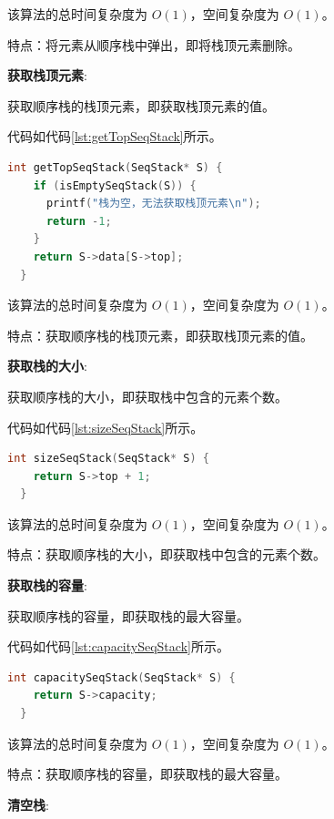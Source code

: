 \documentclass[lang=cn,newtx,10pt,scheme=chinese]{elegantbook}
\begin{document}
该算法的总时间复杂度为 $O(1)$，空间复杂度为 $O(1)$。

特点：将元素从顺序栈中弹出，即将栈顶元素删除。

\textbf{获取栈顶元素}:

获取顺序栈的栈顶元素，即获取栈顶元素的值。

代码如代码\ref{lst:getTopSeqStack}所示。

\begin{lstlisting}[language=C++, caption={获取顺序栈的栈顶元素示例代码}, label={lst:getTopSeqStack}]
  int getTopSeqStack(SeqStack* S) {
    if (isEmptySeqStack(S)) {
      printf("栈为空，无法获取栈顶元素\n");
      return -1;
    }
    return S->data[S->top];
  }

\end{lstlisting}

该算法的总时间复杂度为 $O(1)$，空间复杂度为 $O(1)$。

特点：获取顺序栈的栈顶元素，即获取栈顶元素的值。

\textbf{获取栈的大小}:

获取顺序栈的大小，即获取栈中包含的元素个数。

代码如代码\ref{lst:sizeSeqStack}所示。

\begin{lstlisting}[language=C++, caption={获取顺序栈的大小示例代码}, label={lst:sizeSeqStack}]
  int sizeSeqStack(SeqStack* S) {
    return S->top + 1;
  }

\end{lstlisting}

该算法的总时间复杂度为 $O(1)$，空间复杂度为 $O(1)$。

特点：获取顺序栈的大小，即获取栈中包含的元素个数。

\textbf{获取栈的容量}:

获取顺序栈的容量，即获取栈的最大容量。

代码如代码\ref{lst:capacitySeqStack}所示。

\begin{lstlisting}[language=C++, caption={获取顺序栈的容量示例代码}, label={lst:capacitySeqStack}]
  int capacitySeqStack(SeqStack* S) {
    return S->capacity;
  }

\end{lstlisting}

该算法的总时间复杂度为 $O(1)$，空间复杂度为 $O(1)$。

特点：获取顺序栈的容量，即获取栈的最大容量。

\textbf{清空栈}:
\end{document}
